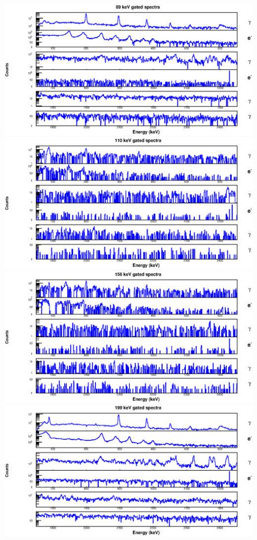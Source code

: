 \begin{landscape}
\includegraphics[scale=1.2]{156Gd_Appendix/89_combined.eps}
\includegraphics[scale=1.2]{156Gd_Appendix/110_combined.eps}
\includegraphics[scale=1.2]{156Gd_Appendix/156_combined.eps}
\includegraphics[scale=1.2]{156Gd_Appendix/199_combined.eps}

\end{landscape}
